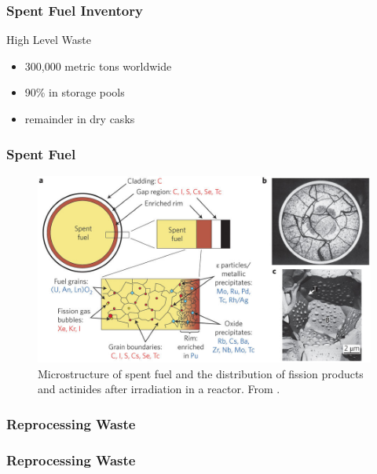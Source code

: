 \begin{frame}[fragile]
        \frametitle{Spent Fuel Inventory}
\begin{block}{High Level Waste}
        \begin{itemize}
                \item 300,000 metric tons worldwide 
                        \cite{ewing_long-term_2016} 
                \item 90\% in storage pools 
                \item remainder in dry casks
        \end{itemize}
                
        \end{block}
\end{frame}

\begin{frame}[fragile]
        \frametitle{Spent Fuel}
        \begin{figure}
        \includegraphics[width=\textwidth]{./images/ewing-microstructure}
                \caption{Microstructure of spent fuel and the distribution of 
                fission products and actinides after irradiation in a reactor. 
                From \cite{ewing_long-term_2016}.}
        \end{figure}
\end{frame}

\begin{frame}[fragile]
        \frametitle{Reprocessing Waste}
                
\end{frame}


\begin{frame}[fragile]
        \frametitle{Reprocessing Waste}
                
\end{frame}
